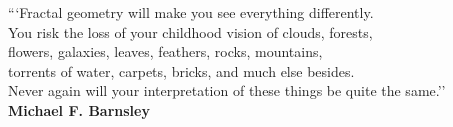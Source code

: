 
\pretextualchapter{}
\vspace{8cm}
\begin{flushright}
\textnormal{```Fractal geometry will make you see everything differently. \\
	 You risk the loss of your childhood vision of clouds, forests,\\
	 flowers, galaxies, leaves, feathers, rocks, mountains,\\
	 torrents of water, carpets, bricks, and much else besides.\\
	 Never again will your interpretation of these things be quite the same.'' \\
	\bfseries Michael F. Barnsley}
\end{flushright}

